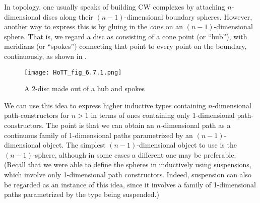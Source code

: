 \documentclass[12pt]{article}
\newcommand{\indexsee}[2]{\index{#1|see{#2}}}
\begin{document}
\indexsee{spoke}{hub and spoke}%
%

In topology, one usually speaks of building CW complexes by attaching $n$-dimensional discs along their $(n-1)$-dimensional boundary spheres.
%
However, another way to express this is by gluing in the \emph{cone} on an $(n-1)$-dimensional sphere.
That is, we regard a disc as consisting of a cone point (or ``hub''), with meridians
%
(or ``spokes'') connecting that point to every point on the boundary, continuously, as shown in .

\begin{figure}
  \centering
  \texttt{[image: HoTT\_fig\_6.7.1.png]}
  \caption{A 2-disc made out of a hub and spokes}
  \label{fig:hub-and-spokes}
\end{figure}

We can use this idea to express higher inductive types containing $n$-dimensional path-con\-struc\-tors for $n>1$ in terms of ones containing only 1-di\-men\-sion\-al path-con\-struc\-tors.
The point is that we can obtain an $n$-dimensional path as a continuous family of 1-dimensional paths parametrized by an $(n-1)$-di\-men\-sion\-al object.
The simplest $(n-1)$-dimensional object to use is the $(n-1)$-sphere, although in some cases a different one may be preferable.
(Recall that we were able to define the spheres in  inductively using suspensions, which involve only 1-dimensional path constructors.
Indeed, suspension can also be regarded as an instance of this idea, since it involves a family of 1-dimensional paths parametrized by the type being suspended.)
\end{document}
